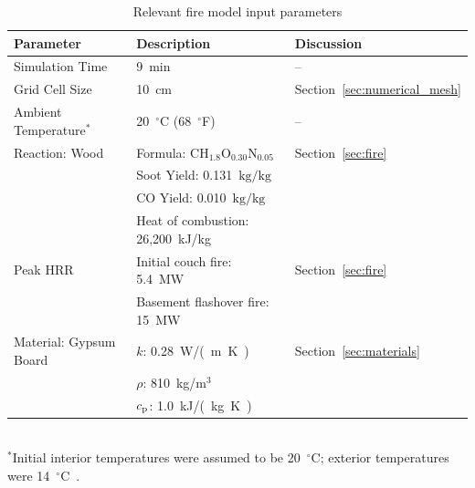 \documentclass[12pt,oneside]{book}
\renewcommand{\C}{\mbox{C}}
\renewcommand{\H}{\mbox{H}}
\renewcommand{\O}{\mbox{O}}
\newcommand{\N}{\mbox{N}}
\begin{document}
\begin{table}[!ht]
\caption[Relevant fire model input parameters]{Relevant fire model input parameters}
\begin{tabular}{lll}
\toprule
Parameter                                 &  Description                                  &  Discussion                        \\
\midrule
Simulation Time                           &  9~min                                        &  --                                \\
Grid Cell Size                            &  10~cm                                        &  Section~\ref{sec:numerical_mesh}  \\
Ambient Temperature$^*$                   &  20~$^{\circ}$C (68~$^{\circ}$F)              &  --                                \\
Reaction: Wood~\cite{SFPE:Tewarson}       &  Formula: $\C\H_{1.8}\O_{0.30}\N_{0.05}$      &  Section~\ref{sec:fire}            \\
                                          &  Soot Yield: 0.131~$\mathrm{kg}/\mathrm{kg}$  &                                    \\
                                          &  CO Yield: 0.010~$\mathrm{kg}/\mathrm{kg}$    &                                    \\
                                          &  Heat of combustion: 26,200~kJ/kg             &                                    \\
Peak HRR                                  &  Initial couch fire: 5.4~MW                   &  Section~\ref{sec:fire}            \\
                                          &  Basement flashover fire: 15~MW               &                                    \\
Material: Gypsum Board~\cite{WAKILI2007}  &  $k$: 0.28~\si{W/(m.K)}                       &  Section~\ref{sec:materials}       \\
                                          &  $\rho$: 810~kg/m$^3$                         &                                    \\
                                          &  $c_{\rm p}$: 1.0~\si{kJ/(kg.K)}                  &                                    \\
\bottomrule
\end{tabular}
\footnotesize
\\ $^{*}$Initial interior temperatures were assumed to be 20~$^{\circ}$C; exterior temperatures were 14~$^{\circ}$C~\cite{NIOSH:Bowyer2}.
\normalsize
\label{tab:model_parameters}
\end{table}
\end{document}
